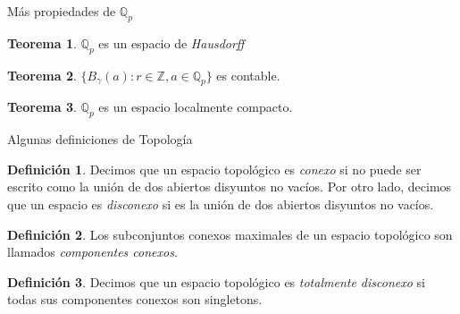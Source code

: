 \documentclass{beamer}
\theoremstyle{definition}
\numberwithin{equation}{section}
\newcommand{\marine}[1]{\textcolor{defColor}{#1}}
\newcommand{\orangee}[1]{\textcolor{thColor}{#1}}
\newtheorem{df}{\marine{Definición}}
\newtheorem{thh}{\orangee{Teorema}}
\newcommand{\tit}[1]{\textit{#1}}
\newcommand{\Z}{\mathbb{Z}}
\newcommand{\Qp}{\mathbb{Q}_p}
\begin{document}
\begin{frame}{Más propiedades de $\Qp$ }
\begin{thh}
	$\Qp$ es un espacio de \tit{Hausdorff}
\end{thh}
\begin{thh}
	$\{B_\gamma (a)\colon r\in\Z, a\in\Qp\}$ es contable.
\end{thh}
\begin{thh}
	$\Qp$ es un espacio localmente compacto.
\end{thh}
	
	
\end{frame}
\begin{frame}{Algunas definiciones de Topología}
\begin{df}
		Decimos que un espacio topológico es \tit{conexo} si no puede ser escrito como la unión de dos abiertos disyuntos no vacíos. Por otro lado, decimos que un espacio es \tit{disconexo} si es la unión de dos abiertos disyuntos no vacíos.
\end{df}

\begin{df}
Los subconjuntos conexos maximales de un espacio topológico son llamados \tit{componentes conexos}.
\end{df}

\begin{df}
	Decimos que un espacio topológico es \tit{totalmente disconexo} si todas sus componentes conexos son singletons.
\end{df}
	
\end{frame}
\end{document}
